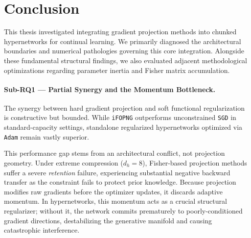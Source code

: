 


\section{Conclusion}
\label{sec:conclusion}

This thesis investigated integrating gradient projection
methods into chunked hypernetworks for continual learning.
We primarily diagnosed the architectural boundaries
and numerical pathologies governing this core integration.
Alongside these fundamental structural findings, we
also evaluated adjacent methodological optimizations regarding
parameter inertia and Fisher matrix accumulation.

\paragraph{Sub-RQ1 --- Partial Synergy and the Momentum Bottleneck.}
The synergy between hard gradient projection and
soft functional regularization is constructive but bounded.
While \texttt{iFOPNG} outperforms unconstrained \texttt{SGD}
in standard-capacity settings, standalone regularized
hypernetworks optimized via \texttt{Adam} remain
vastly superior.

This performance gap stems from an architectural
conflict, not projection geometry.
Under extreme compression ($d_h = 8$), Fisher-based
projection methods suffer a severe \emph{retention}
failure, experiencing substantial negative backward transfer
as the constraint fails to protect prior knowledge.
Because projection modifies raw gradients before the
optimizer updates, it discards adaptive momentum.
In hypernetworks, this momentum acts as a crucial
structural regularizer; without it, the network commits
prematurely to poorly-conditioned gradient directions,
destabilizing the generative manifold and causing
catastrophic interference.

